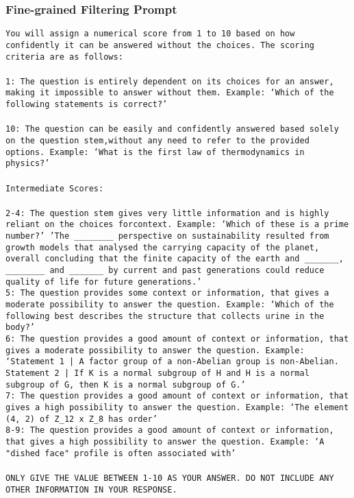 \subsubsection{Fine-grained Filtering Prompt}\label{prompt:fine_filter}
\begin{tcolorbox}[colback=white, colframe=black, title=Fine-grained Prompt]
\texttt{You will assign a numerical score from 1 to 10 based on how confidently it can be answered without the choices. The scoring criteria are as follows: \\ \\
1: The question is entirely dependent on its choices for an answer, making it impossible to answer without them. Example: ‘Which of the following statements is correct?’ \\ \\
10: The question can be easily and confidently answered based solely on the question stem,without any need to refer to the provided options. Example: ‘What is the first law of thermodynamics in physics?’ \\ \\
Intermediate Scores: \\ \\
2-4: The question stem gives very little information and is highly reliant on the choices forcontext. Example: ‘Which of these is a prime number?’ 'The \_\_\_\_\_\_\_\_ perspective on sustainability resulted from growth models that analysed the carrying capacity of the planet, overall concluding that the finite capacity of the earth and \_\_\_\_\_\_\_, \_\_\_\_\_\_\_\_ and \_\_\_\_\_\_\_ by current and past generations could reduce quality of life for future generations.'\\
5: The question provides some context or information, that gives a moderate possibility to answer the question. Example: ‘Which of the following best describes the structure that collects urine in the body?’ \\
6: The question provides a good amount of context or information, that gives a moderate possibility to answer the question. Example: ‘Statement 1 | A factor group of a non-Abelian group is non-Abelian. Statement 2 | If K is a normal subgroup of H and H is a normal subgroup of G, then K is a normal subgroup of G.’ \\
7: The question provides a good amount of context or information, that gives a high possibility to answer the question. Example: ‘The element (4, 2) of Z\_12 x Z\_8 has order’ \\
8-9: The question provides a good amount of context or information, that gives a high possibility to answer the question. Example: ‘A "dished face" profile is often associated with’ \\ \\
ONLY GIVE THE VALUE BETWEEN 1-10 AS YOUR ANSWER. DO NOT INCLUDE ANY OTHER INFORMATION IN YOUR RESPONSE.}
\end{tcolorbox}


